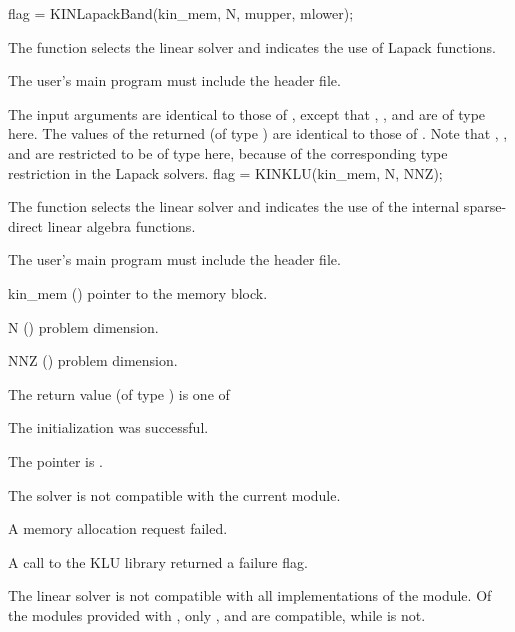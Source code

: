 {
  flag = KINLapackBand(kin\_mem, N, mupper, mlower);
}
{
  The function  selects the {\kinband} linear solver and
  indicates the use of Lapack functions. 

  The user's main program must include the  header file.
}
{
  The input arguments are identical to those of , except
  that , , and  are of type  here.
}
{
  The values of the returned  (of type ) are identical
  to those of .
}
{
  Note that , , and  are restricted to be of type 
  here, because of the corresponding type restriction in the Lapack solvers.
}
{
  flag = KINKLU(kin\_mem, N, NNZ);
}
{
  The function  selects the {\kinklu} linear solver and indicates
  the use of the internal sparse-direct linear algebra functions. 

  The user's main program must include the  header file.
}
{
  \begin{args}
  \item[kin\_mem] ()
    pointer to the {\kinsol} memory block.
  \item[N] ()
    problem dimension.
  \item[NNZ] ()
    problem dimension.
  \end{args}
}
{
  The return value  (of type ) is one of
  \begin{args}
  \item[\Id{KINSLS\_SUCCESS}] 
    The {\kinklu} initialization was successful.
  \item[\Id{KINSLS\_MEM\_NULL}]
    The  pointer is .
  \item[\Id{KINSLS\_ILL\_INPUT}]
    The {\kinklu} solver is not compatible with the current {\nvector} module.
  \item[\Id{KINSLS\_MEM\_FAIL}]
    A memory allocation request failed.
  \item[\Id{KINSLS\_PACKAGE\_FAIL}]
    A call to the KLU library returned a failure flag.
  \end{args}
}
{
  The {\kinklu} linear solver is not compatible with all
  implementations of the {\nvector} module.  Of the {\nvector} modules
  provided with {\sundials}, only {\nvecs}, {\nvecopenmp} and
  {\nvecpthreads} are compatible, while {\nvecp} is not.
}
